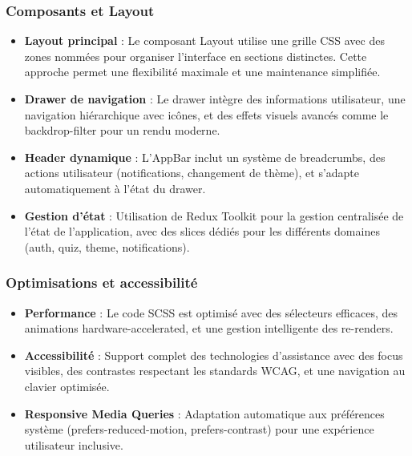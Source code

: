 \documentclass[12pt,a4paper]{report}
\begin{document}
\subsubsection{Composants et Layout}

\begin{itemize}
\item \textbf{Layout principal} : Le composant Layout utilise une grille CSS avec des zones nommées pour organiser l'interface en sections distinctes. Cette approche permet une flexibilité maximale et une maintenance simplifiée.

\item \textbf{Drawer de navigation} : Le drawer intègre des informations utilisateur, une navigation hiérarchique avec icônes, et des effets visuels avancés comme le backdrop-filter pour un rendu moderne.

\item \textbf{Header dynamique} : L'AppBar inclut un système de breadcrumbs, des actions utilisateur (notifications, changement de thème), et s'adapte automatiquement à l'état du drawer.

\item \textbf{Gestion d'état} : Utilisation de Redux Toolkit pour la gestion centralisée de l'état de l'application, avec des slices dédiés pour les différents domaines (auth, quiz, theme, notifications).
\end{itemize}

\subsubsection{Optimisations et accessibilité}

\begin{itemize}
\item \textbf{Performance} : Le code SCSS est optimisé avec des sélecteurs efficaces, des animations hardware-accelerated, et une gestion intelligente des re-renders.

\item \textbf{Accessibilité} : Support complet des technologies d'assistance avec des focus visibles, des contrastes respectant les standards WCAG, et une navigation au clavier optimisée.

\item \textbf{Responsive Media Queries} : Adaptation automatique aux préférences système (prefers-reduced-motion, prefers-contrast) pour une expérience utilisateur inclusive.
\end{itemize}
\end{document}
